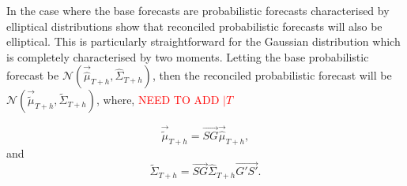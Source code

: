 \documentclass[graybox]{svmult}
\begin{document}


In the case where the base forecasts are probabilistic forecasts characterised by elliptical distributions \cite{Gamakumara2018} show that reconciled probabilistic forecasts will also be elliptical.  This is particularly straightforward for the Gaussian distribution which is completely characterised by two moments.  Letting the base probabilistic forecast be $\mathscr{N}(\vec{\hat{\mu}}_{T+h}, \hat{\Sigma}_{T+h})$, then the reconciled probabilistic forecast will be $\mathscr{N}(\vec{\tilde{\mu}}_{T+h}, \tilde{\Sigma}_{T+h})$, where, \textcolor{red}{NEED TO ADD $|T$}

\begin{equation}\label{eq:17}
\vec{\tilde{\mu}}_{T+h} = \vec{SG}\vec{\hat{\mu}}_{T+h},
\end{equation}
and
\begin{equation}\label{eq:18}
\tilde{\Sigma}_{T+h} = \vec{SG}\hat{\Sigma}_{T+h}\vec{G'S'}.
\end{equation}
\end{document}
